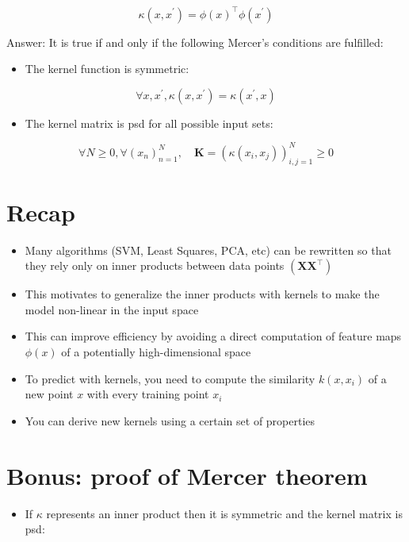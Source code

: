 $$
\kappa\left(x, x^{\prime}\right)=\phi(x)^{\top} \phi\left(x^{\prime}\right)
$$

Answer: It is true if and only if the following Mercer's conditions are fulfilled:

\begin{itemize}
  \item The kernel function is symmetric:
\end{itemize}

$$
\forall x, x^{\prime}, \kappa\left(x, x^{\prime}\right)=\kappa\left(x^{\prime}, x\right)
$$

\begin{itemize}
  \item The kernel matrix is psd for all possible input sets:
\end{itemize}

$$
\forall N \geq 0, \forall\left(x_{n}\right)_{n=1}^{N}, \quad \mathbf{K}=\left(\kappa\left(x_{i}, x_{j}\right)\right)_{i, j=1}^{N} \geqslant 0
$$

\section*{Recap}
\begin{itemize}
  \item Many algorithms (SVM, Least Squares, PCA, etc) can be rewritten so that they rely only on inner products between data points $\left(\mathbf{X X}^{\top}\right)$

  \item This motivates to generalize the inner products with kernels to make the model non-linear in the input space

  \item This can improve efficiency by avoiding a direct computation of feature maps $\phi(x)$ of a potentially high-dimensional space

  \item To predict with kernels, you need to compute the similarity $k\left(x, x_{i}\right)$ of a new point $x$ with every training point $x_{i}$

  \item You can derive new kernels using a certain set of properties

\end{itemize}

\section*{Bonus: proof of Mercer theorem}
\begin{itemize}
  \item If $\kappa$ represents an inner product then it is symmetric and the kernel matrix is psd:
\end{itemize}

